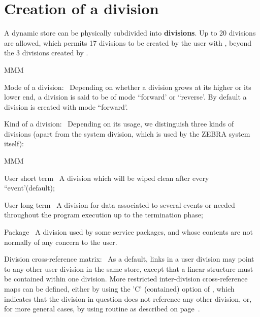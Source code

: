 \section{Creation of a division}
\par A dynamic store can be physically subdivided into {\bf divisions}.
Up to 20 divisions are allowed, which permits 17 divisions
to be created by the user with , beyond the 3 divisions
created by .
\begin{DL}{MMM}
\item[Mode of a division:]\ Depending on whether a division grows
at its higher or its lower end,
a division is said to be of mode ``forward' or ``reverse'.
By default a division is created with mode ``forward'.
\item[Kind of a division:]\ Depending on its usage,
we distinguish three kinds of divisions (apart from the
system division, which is used by the ZEBRA system itself):
\begin{DL}{MMM}
\item[User short term]\ A division which will be wiped clean after every
``event'(default);
\item[User long term]\ A division for data associated to several events or
needed throughout the program execution up to the termination phase;
\item[Package]\ A division used by some service
packages, and whose contents are not normally of any concern to the user.
\end{DL}
\item[Division cross-reference matrix:]\ As a default, links in a user division
may point to any other user division in the same store,
except that a linear structure must be contained within one division.
More restricted inter-division cross-reference maps can be defined,
either by using the
'C' (contained) option of , which indicates that the division
in question does not reference any other division, or, for more general
cases, by using routine 
as described on page~\pageref{SR_MZXREF}.
\end{DL}
\Idesc
